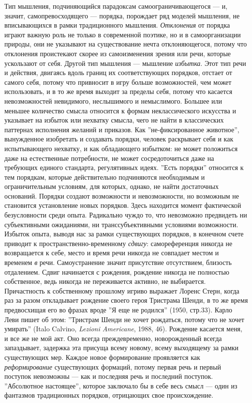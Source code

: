 \documentclass[12pt]{book}
\begin{document}
Тип мышления, подчиняющийся парадоксам самоограничивающегося --- и, значит, самопревосходящего --- порядка, порождает ряд моделей мышления, не вписывающихся в рамки традиционного мышления. \textit{Отклонения} от порядка играют важную роль не только в современной поэтике, но и в самоорганизации природы, они не указывают на существование нечта отклоняющегося, потому что отклонения проистекают скорее из самоизменения зрения или речи, которые ускользают от себя. Другой тип мышления --- мышление \textit{избытка}. Этот тип речи и действия, двигаясь вдоль границ их соответствующих порядков, отстает от самого себя, потому что привносит в игру больше возможностей, чем может использовать, и в то же время выходит за пределы себя, потому что касается невозможностей невидимого, неслышимого и немыслимого. Большее или меньшее количество смысла относится к формам неклассического искусства и указывает на избыток или нехватку смысла, чего не найти в классических паттернах исполнения желаний и приказов. Как ''не-фиксированное животное'', вынужденное изобретать и создавать порядки, человек раскрывает себя и как испытывающего нехватку, и как обладающего избытком: не может положиться даже на естественные потребности, не может сосредоточиться даже на требующих единого стандарта, регулятивных идеях. ''Есть порядки'' относится к тем порядкам, которые действительно подчиняются необходимым и ограничительным условиям, для которых, однако, не найти достаточных оснований. Порядки создают возможности и невозможности, но возможным не становится установление новых порядков. Здесь находится момент фактической безусловности среди опыта. Радикально чуждо то, что невозможно предвидеть ни субъективными ожиданиями, ни транссубъективными условиями возможности. Избыток опыта, выводя нас за рамки существующих порядков, в конечном счете приводит к пространственно-временному \textit{сдвигу}: самореференция никогда не возвращается к себе, место и время речи никогда не совпадает местом и временем \textit{в} речи. Самоустранение значит присутствие отсутствием, близость отдалением. Сдвиг начинается с рождения, рождение никогда не полностью собственное, ведь никогда не переживается активно, не выбирается. Причастность к собственному прошлому игриво выражает Лоренс Стерн, когда раз за разом откладывает рождение своего героя Тристрама Шенди, в то же время предвосхищая его во фразах вроде ''Я еще не родился'' (1950, стр.33). Карло Леви пишет об этом: ''Тристрам Шенди не хочет рождаться, потому что не хочет умирать'' (Italo Calvino, \textit{Lezioni Americane}, 1988, 46). Рождение касается меня, и все же не мой акт. Оно всегда преждевременно, новорожденный всегда запаздывает, задержка эта присуща всему новому, всему выходящему за рамки существующих мер. Каждое новое формирование проявляется как \textit{реформирование} существующих формаций, потому первая речь и первый поступок невозможны --- как и последняя речь и последний поступок. ''Абсолютное настоящее'', которое заключало бы в себе весь смысл --- один из фантазмов традиционных порядков, отрицающих свое происхождение.
\end{document}
